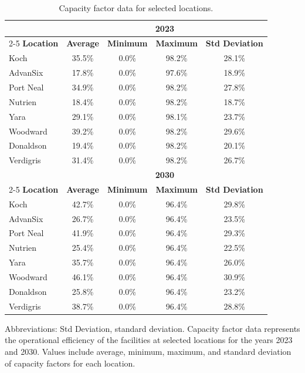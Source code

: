 \documentclass{article}
\begin{document}
\begin{table}[H]
  \centering
  \caption{Capacity factor data for selected locations.}
  \label{table:capacity_factor_data}
  \begin{tabular}{@{}lcccc@{}}
    \toprule
    & \multicolumn{4}{c}{\textbf{2023}} \\ \cmidrule(lr){2-5}
    \textbf{Location} & \textbf{Average} & \textbf{Minimum} & \textbf{Maximum} & \textbf{Std Deviation} \\ \midrule
    Koch & 35.5\% & 0.0\% & 98.2\% & 28.1\% \\
    AdvanSix & 17.8\% & 0.0\% & 97.6\% & 18.9\% \\
    Port Neal & 34.9\% & 0.0\% & 98.2\% & 27.8\% \\
    Nutrien & 18.4\% & 0.0\% & 98.2\% & 18.7\% \\
    Yara & 29.1\% & 0.0\% & 98.1\% & 23.7\% \\
    Woodward & 39.2\% & 0.0\% & 98.2\% & 29.6\% \\
    Donaldson & 19.4\% & 0.0\% & 98.2\% & 20.1\% \\
    Verdigris & 31.4\% & 0.0\% & 98.2\% & 26.7\% \\ \midrule
    & \multicolumn{4}{c}{\textbf{2030}} \\ \cmidrule(lr){2-5}
    \textbf{Location} & \textbf{Average} & \textbf{Minimum} & \textbf{Maximum} & \textbf{Std Deviation} \\ \midrule
    Koch & 42.7\% & 0.0\% & 96.4\% & 29.8\% \\
    AdvanSix & 26.7\% & 0.0\% & 96.4\% & 23.5\% \\
    Port Neal & 41.9\% & 0.0\% & 96.4\% & 29.3\% \\
    Nutrien & 25.4\% & 0.0\% & 96.4\% & 22.5\% \\
    Yara & 35.7\% & 0.0\% & 96.4\% & 26.0\% \\
    Woodward & 46.1\% & 0.0\% & 96.4\% & 30.9\% \\
    Donaldson & 25.8\% & 0.0\% & 96.4\% & 23.2\% \\
    Verdigris & 38.7\% & 0.0\% & 96.4\% & 28.8\% \\ \bottomrule
  \end{tabular}
  \begin{tablenotes}
  \small
  \item Abbreviations: Std Deviation, standard deviation. Capacity factor data represents the operational efficiency of the facilities at selected locations for the years 2023 and 2030. Values include average, minimum, maximum, and standard deviation of capacity factors for each location.
\end{tablenotes}

\end{table}
\end{document}
